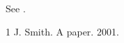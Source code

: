 \documentclass{elscopy0}
\begin{document}
See \citep{a}.
\begin{thebibliography}{1}
 J. Smith. A paper. 2001.
\end{thebibliography}
\end{document}
